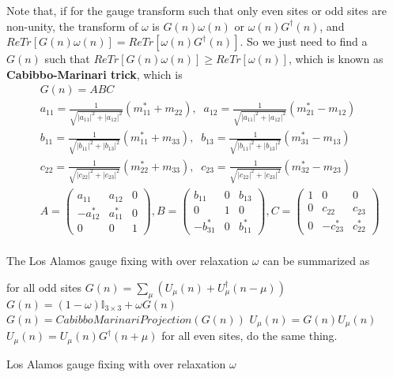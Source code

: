 Note that, if for the gauge transform such that only even sites or odd sites are non-unity, the transform of $\omega$ is $G(n)\omega (n)$ or $\omega (n)G^{\dagger}(n)$, and $ReTr[G(n)\omega (n)]=ReTr[\omega (n)G^{\dagger}(n)]$. So we just need to find a $G(n)$ such that $ReTr[G(n)\omega (n)]\geq ReTr[\omega (n)]$, which is known as \textbf{Cabibbo-Marinari trick}, which is
\begin{equation}
\begin{split}
&G(n)=ABC\\
&a_{11}=\frac{1}{\sqrt{|a_{11}|^2+|a_{12}|^2}}(m_{11}^*+m_{22}),\;\;a_{12}=\frac{1}{\sqrt{|a_{11}|^2+|a_{12}|^2}}(m_{21}^*-m_{12})\\
&b_{11}=\frac{1}{\sqrt{|b_{11}|^2+|b_{13}|^2}}(m_{11}^*+m_{33}),\;\;b_{13}=\frac{1}{\sqrt{|b_{11}|^2+|b_{13}|^2}}(m_{31}^*-m_{13})\\
&c_{22}=\frac{1}{\sqrt{|c_{22}|^2+|c_{23}|^2}}(m_{22}^*+m_{33}),\;\;c_{23}=\frac{1}{\sqrt{|c_{22}|^2+|c_{23}|^2}}(m_{32}^*-m_{23})\\
&A=\left(\begin{array}{ccc} a_{11} & a_{12} & 0 \\ -a_{12}^* & a_{11}^* & 0 \\ 0 & 0 & 1 \end{array}\right),B=\left(\begin{array}{ccc} b_{11} & 0 & b_{13} \\ 0 & 1 & 0 \\ -b_{31}^* & 0 & b_{11}^* \end{array}\right),C=\left(\begin{array}{ccc} 1 & 0 & 0 \\ 0 & c_{22} & c_{23} \\ 0 & -c_{23}^* & c_{22}^* \end{array}\right)\\
\end{split}
\end{equation}

The Los Alamos gauge fixing with over relaxation $\omega $ can be summarized as
\begin{algorithm}[H]
\begin{algorithmic}
        \Return
    \EndIf
    \State for all odd sites
    \State $G(n)=\sum _{\mu}\left(U_{\mu}(n)+U_{\mu}^{\dagger}(n-\mu)\right)$
    \State $G(n)=(1-\omega)\mathbb{I}_{3\times 3}+\omega G(n)$
    \State $G(n)=CabibboMarinariProjection(G(n))$
        \State $U_{\mu} (n)=G(n)U_{\mu} (n)$
    \Else
        \State $U_{\mu} (n)=U_{\mu} (n)G^{\dagger}(n+\mu)$
    \EndIf
    \State for all even sites, do the same thing.
\EndFor
\end{algorithmic}
\caption{\label{alg.LosAlamosGaugeFixing}Los Alamos gauge fixing with over relaxation $\omega $}
\end{algorithm}

